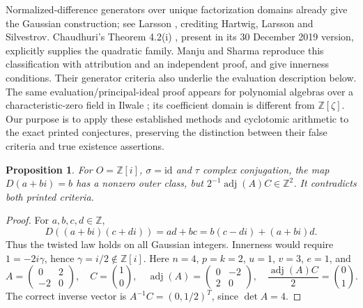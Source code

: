 \documentclass[11pt]{article}
\newtheorem{proposition}[theorem]{Proposition}
\newcommand{\ZZ}{\mathbb Z}
\newcommand{\adj}{\operatorname{adj}}
\begin{document}
Normalized-difference generators over unique factorization domains
already give the Gaussian construction; see Larsson
\cite[Theorem 2.6, p.~11]{Larsson}, crediting Hartwig, Larsson and
Silvestrov. Chaudhuri's Theorem 4.2(i) \cite{C}, present in its
30 December 2019 version, explicitly supplies the quadratic family.
Manju and Sharma \cite[Theorems 3.2--3.4,
pp.~12--13]{MSrings} reproduce this classification with attribution and
an independent proof, and give innerness conditions. Their generator criteria
\cite[Lemma 2.12 and Corollary 3.7]{MS} also underlie the evaluation
description below. The same evaluation/principal-ideal proof appears for
polynomial algebras over a characteristic-zero field in Ilwale
\cite[Proposition 3.3, p.~9]{Ilwale}; its coefficient domain is different
from $\ZZ[\zeta]$. Our purpose is to apply these established methods and
cyclotomic arithmetic to the exact printed conjectures, preserving the
distinction between their false criteria and true existence assertions.

\begin{proposition}\label{prop:gaussian}
For $O=\ZZ[i]$, $\sigma=\mathrm{id}$ and $\tau$ complex conjugation,
the map $D(a+bi)=b$ has a nonzero outer class, but
$2^{-1}\adj(A)C\in\ZZ^2$. It contradicts both printed criteria.
\end{proposition}
\begin{proof}
For $a,b,c,d\in\ZZ$,
\[
 D((a+bi)(c+di))=ad+bc=b(c-di)+(a+bi)d.
\]
Thus the twisted law holds on all Gaussian integers. Innerness would
require $1=-2i\gamma$, hence $\gamma=i/2\notin\ZZ[i]$.
Here $n=4$, $p=k=2$, $u=1$, $v=3$, $e=1$, and
\[
 A=\begin{pmatrix}0&2\\-2&0\end{pmatrix},\quad C=\binom10,
 \quad \adj(A)=\begin{pmatrix}0&-2\\2&0\end{pmatrix},
 \quad \frac{\adj(A)C}{2}=\binom01.
\]
The correct inverse vector is $A^{-1}C=(0,1/2)^T$, since $\det A=4$.
\end{proof}
\end{document}
